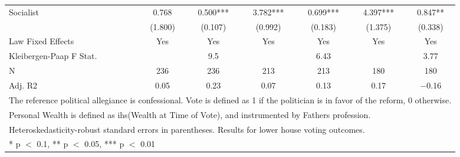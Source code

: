 \begin{table}
\begin{tabular}[t]{lcccccc}
Socialist & \num{0.768} & \num{0.500}*** & \num{3.782}*** & \num{0.699}*** & \num{4.397}*** & \num{0.847}**\\
 & (\num{1.800}) & (\num{0.107}) & (\num{0.992}) & (\num{0.183}) & (\num{1.375}) & (\num{0.338})\\
\midrule
Law Fixed Effects & Yes & Yes & Yes & Yes & Yes & Yes\\
Kleibergen-Paap F Stat. &  & 9.5 &  & 6.43 &  & 3.77\\
N & \num{236} & \num{236} & \num{213} & \num{213} & \num{180} & \num{180}\\
Adj. R2 & \num{0.05} & \num{0.23} & \num{0.07} & \num{0.13} & \num{0.17} & \num{-0.16}\\
\bottomrule
\multicolumn{7}{l}{\rule{0pt}{1em}The reference political allegiance is confessional. Vote is defined as 1 if the politician is in favor of the reform, 0 otherwise.}\\
\multicolumn{7}{l}{\rule{0pt}{1em}Personal Wealth is defined as ihs(Wealth at Time of Vote), and instrumented by Fathers profession.}\\
\multicolumn{7}{l}{\rule{0pt}{1em}Heteroskedasticity-robust standard errors in parentheses. Results for lower house voting outcomes.}\\
\multicolumn{7}{l}{\rule{0pt}{1em}* p $<$ 0.1, ** p $<$ 0.05, *** p $<$ 0.01}\\
\end{tabular}
\end{table}
